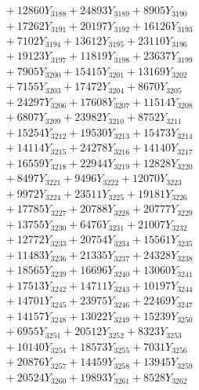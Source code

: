 \documentclass[a4paper,10pt]{article}
\begin{document}
{\begin{align}
&\;  + 12860 Y_{3188} + 24893 Y_{3189} + 8905 Y_{3190} \\[0.3ex]
&\;  + 17262 Y_{3191} + 20197 Y_{3192} + 16126 Y_{3193} \\[0.3ex]
&\;  + 7102 Y_{3194} + 13612 Y_{3195} + 23110 Y_{3196} \\[0.3ex]
&\;  + 19123 Y_{3197} + 11819 Y_{3198} + 23637 Y_{3199} \\[0.3ex]
&\;  + 7905 Y_{3200} + 15415 Y_{3201} + 13169 Y_{3202} \\[0.3ex]
&\;  + 7155 Y_{3203} + 17472 Y_{3204} + 8670 Y_{3205} \\[0.3ex]
&\;  + 24297 Y_{3206} + 17608 Y_{3207} + 11514 Y_{3208} \\[0.5ex]\allowbreak
&\;  + 6807 Y_{3209} + 23982 Y_{3210} + 8752 Y_{3211} \\[0.3ex]
&\;  + 15254 Y_{3212} + 19530 Y_{3213} + 15473 Y_{3214} \\[0.3ex]
&\;  + 14114 Y_{3215} + 24278 Y_{3216} + 14140 Y_{3217} \\[0.3ex]
&\;  + 16559 Y_{3218} + 22944 Y_{3219} + 12828 Y_{3220} \\[0.3ex]
&\;  + 8497 Y_{3221} + 9496 Y_{3222} + 12070 Y_{3223} \\[0.3ex]
&\;  + 9972 Y_{3224} + 23511 Y_{3225} + 19181 Y_{3226} \\[0.3ex]
&\;  + 17785 Y_{3227} + 20788 Y_{3228} + 20777 Y_{3229} \\[0.3ex]
&\;  + 13755 Y_{3230} + 6476 Y_{3231} + 21007 Y_{3232} \\[0.3ex]
&\;  + 12772 Y_{3233} + 20754 Y_{3234} + 15561 Y_{3235} \\[0.3ex]
&\;  + 11483 Y_{3236} + 21335 Y_{3237} + 24328 Y_{3238} \\[0.5ex]\allowbreak
&\;  + 18565 Y_{3239} + 16696 Y_{3240} + 13060 Y_{3241} \\[0.3ex]
&\;  + 17513 Y_{3242} + 14711 Y_{3243} + 10197 Y_{3244} \\[0.3ex]
&\;  + 14701 Y_{3245} + 23975 Y_{3246} + 22469 Y_{3247} \\[0.3ex]
&\;  + 14157 Y_{3248} + 13022 Y_{3249} + 15239 Y_{3250} \\[0.3ex]
&\;  + 6955 Y_{3251} + 20512 Y_{3252} + 8323 Y_{3253} \\[0.3ex]
&\;  + 10140 Y_{3254} + 18573 Y_{3255} + 7031 Y_{3256} \\[0.3ex]
&\;  + 20876 Y_{3257} + 14459 Y_{3258} + 13945 Y_{3259} \\[0.3ex]
&\;  + 20524 Y_{3260} + 19893 Y_{3261} + 8528 Y_{3262} \\[0.3ex]

\end{align}}
\end{document}
